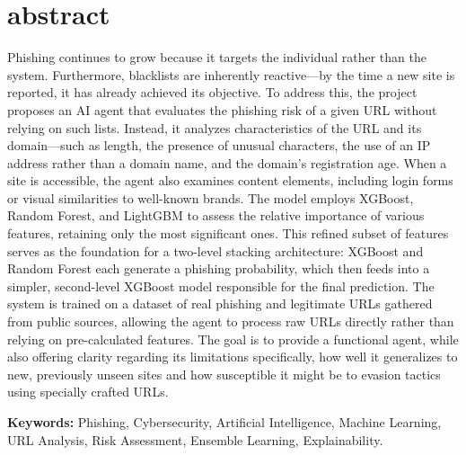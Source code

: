 \section{abstract}
    Phishing continues to grow because it targets the individual rather than the system. Furthermore, blacklists are inherently reactive—by the time a new site is reported, it has already achieved its objective. To address this, the project proposes an AI agent that evaluates the phishing risk of a given URL without relying on such lists. Instead, it analyzes characteristics of the URL and its domain—such as length, the presence of unusual characters, the use of an IP address rather than a domain name, and the domain's registration age. When a site is accessible, the agent also examines content elements, including login forms or visual similarities to well-known brands. The model employs XGBoost, Random Forest, and LightGBM to assess the relative importance of various features, retaining only the most significant ones. This refined subset of features serves as the foundation for a two-level stacking architecture: XGBoost and Random Forest each generate a phishing probability, which then feeds into a simpler, second-level XGBoost model responsible for the final prediction. The system is trained on a dataset of real phishing and legitimate URLs gathered from public sources, allowing the agent to process raw URLs directly rather than relying on pre-calculated features. The goal is to provide a functional agent, while also offering clarity regarding its limitations specifically, how well it generalizes to new, previously unseen sites and how susceptible it might be to evasion tactics using specially crafted URLs.
\newline \par

\textbf{Keywords:} Phishing, Cybersecurity, Artificial Intelligence, Machine Learning, URL Analysis, Risk Assessment, Ensemble Learning, Explainability.
